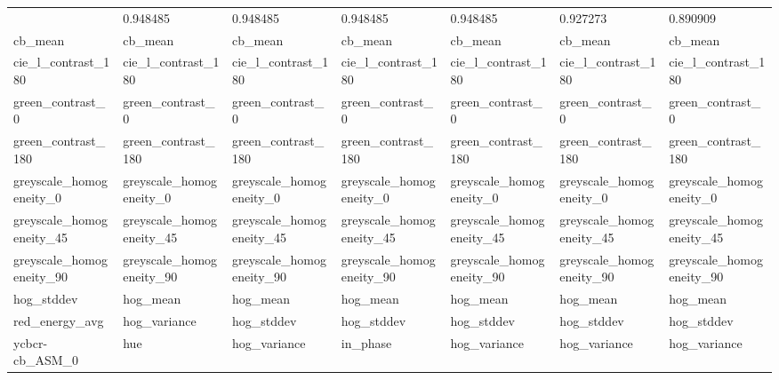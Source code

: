 \documentclass[letterpaper]{article}
\begin{document}
{\begin{tiny}
\begin{longtable}{lllllll}
\bottomrule
\endlastfoot
                0.948485 &                 0.948485 &                 0.948485 &                 0.948485 &
         0.948485 &                 0.927273 &                 0.890909 \\
                 cb\_mean &                  cb\_mean &                  cb\_mean &                  cb\_mean &
              cb\_mean &                  cb\_mean &                  cb\_mean \\
      cie\_l\_contrast\_180 &       cie\_l\_contrast\_180 &       cie\_l\_contrast\_180 &       cie\_l\_contrast\_1
80 &       cie\_l\_contrast\_180 &       cie\_l\_contrast\_180 &       cie\_l\_contrast\_180 \\
        green\_contrast\_0 &         green\_contrast\_0 &         green\_contrast\_0 &         green\_contrast\_0 &
         green\_contrast\_0 &         green\_contrast\_0 &         green\_contrast\_0 \\
      green\_contrast\_180 &       green\_contrast\_180 &       green\_contrast\_180 &       green\_contrast\_180 &
       green\_contrast\_180 &       green\_contrast\_180 &       green\_contrast\_180 \\
 greyscale\_homogeneity\_0 &  greyscale\_homogeneity\_0 &  greyscale\_homogeneity\_0 &  greyscale\_homogeneity\_0 &
  greyscale\_homogeneity\_0 &  greyscale\_homogeneity\_0 &  greyscale\_homogeneity\_0 \\
greyscale\_homogeneity\_45 & greyscale\_homogeneity\_45 & greyscale\_homogeneity\_45 & greyscale\_homogeneity\_45 &
 greyscale\_homogeneity\_45 & greyscale\_homogeneity\_45 & greyscale\_homogeneity\_45 \\
greyscale\_homogeneity\_90 & greyscale\_homogeneity\_90 & greyscale\_homogeneity\_90 & greyscale\_homogeneity\_90 &
 greyscale\_homogeneity\_90 & greyscale\_homogeneity\_90 & greyscale\_homogeneity\_90 \\
              hog\_stddev &                 hog\_mean &                 hog\_mean &                 hog\_mean &
             hog\_mean &                 hog\_mean &                 hog\_mean \\
          red\_energy\_avg &             hog\_variance &               hog\_stddev &               hog\_stddev &
            hog\_stddev &               hog\_stddev &               hog\_stddev \\
          ycbcr-cb\_ASM\_0 &                      hue &             hog\_variance &                 in\_phase &
         hog\_variance &             hog\_variance &             hog\_variance \\
\end{longtable}





\end{tiny}}
\end{document}
